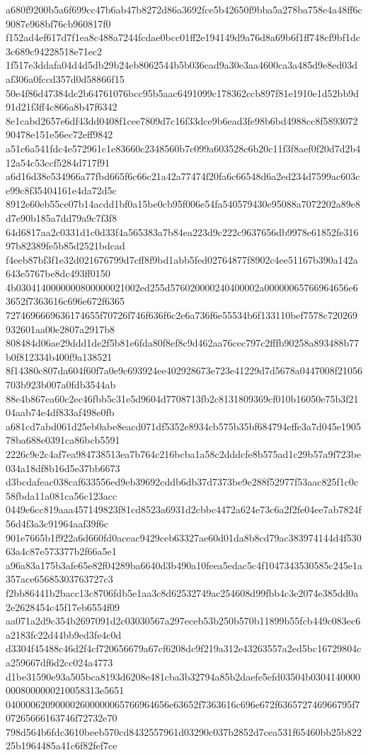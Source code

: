 {a680f9200b5a6f699cc47b6ab47b8272d86a3692fce5b42650f9bba5a278ba758e4a48ff6c9087e968bf76cb960817f0
f152ad4ef617d7f1ea8c488a7244fcdae0bcc01ff2e194149d9a76d8a69b6f1ff748cf9bf1dc3c689c94228518e71ec2
1f517e3ddafa04d4d5db29b24eb8062544b5b036ead9a30e3aa4600ca3a485d9e8ed03daf306a0fccd357d0d58866f15
50e4f86d47384dc2b64761076bcc95b5aac6491099c178362ccb897f81e1910e1d52bb9d91d21f3ff4c866a8b47f6342
8e1cabd2657e6df43dd0408f1cee7809d7c16f33dce9b6ead3fe98b6bd4988cc8f589307290478e151e56ec72eff9842
a51c6a541fdc4e572961c1e83660c2348560b7c099a603528c6b20c11f3f8aef0f20d7d2b412a54c53ccf5284d717f91
a6d16d38e534966a77fbd665f6c66c21a42a77474f20fa6c66548d6a2ed234d7599ac603ce99c8f35404161e4da72d5c
8912e60eb55ce07b14acdd1bf0a15be0cb95f006e54fa540579430e95088a7072202a89e8d7e90b185a7dd79a9c7f3f8
64d6817aa2c0331d1c0d33f4a565383a7b84ea223d9c222c9637656db9978e61852fe31697b82389fe5b85d2521bdcad
f4eeb87bf3f1e32d021676799d7cff8f9bd1abb5fed02764877f8902c4ee51167b390a142a643e5767be8dc493ff0150
4b0304140000000800000021002ed255d576020000240400002a00000065766964656e63652f7363616c696e672f6365
7274696669636174655f70726f746f636f6c2e6a736f6e55534b6f133110bef7578c720269932601aa00e2807a2917b8
808484d06ae29ddd1de2f5b81e6fda80f8ef8c9d462aa76cec797c2fffb90258a893488b77b0f812334b400f9a138521
8f14380c807da604f60f7a0e9c693924ee402928673e723e41229d7d5678a0447008f21056703b923b007a0fdb3544ab
88e4b867ea60c2ec46fbb5c31e5d9604d7708713fb2c8131809369cf010b16050e75b3f2104aab74e4df833af498e0fb
a681cd7abd061d25eb0abe8eacd071df5352e8934cb575b35bf684794effe3a7d045e190578ba688e0391ca86bcb5591
2226c9e2c4af7ea984738513ea7b764c216bcba1a58c2dddcfe8b575ad1c29b57a9f723be034a18df8b16d5e37bb6673
d3bcdafeac038caf633556ed9eb39692cddb6db37d7373be9e288f52977f53aac825f1c0c58fbda11a081ca56c123acc
0449e6cc819aaa457149823f81cd8523a6931d2cbbc4472a624e73c6a2f2fe04ee7ab7824f56d4f3a3c91964aaf39f6c
901e7665b1f922a6d660fd0aceac9429ceb63327ae60d01da8b8cd79ac383974144d4f53063a4c87e573377b2f66a5e1
a96a83a175b3afe65e82f04289ba6640d3b490a10feea5edac5c4f1047343530585c245e1a357ace65685303763727c3
f2bb86441b2bacc13c8706fdb5e1aa3c8d62532749ac254608d99fbb4c3e2074e385dd0a2e2628454c45f17eb6554f09
aa071a2d9c354b2697091d2c03030567a297eceb53b250b570b11899b55fcb449c083ec6a2183fc22d44bb9ed3fe4c0d
d3304f45488c46d2f4cf720656679a67cf6208dc9f219a312e43263557a2ed5bc16729804ca259667df6d2cc024a4773
d1be31590e93a505bca8193d6208e481cba3b32794a85b2daefe5efd03504b03041400000008000000210058313e5651
040000620900002600000065766964656e63652f7363616c696e672f636572746966795f707265666163746f72732e70
798d564b6fdc3610beeb570cd8432557961d03290c037b2852d7cea531f65460bb25b82225b1964485a41c6f82fef7ce
}
